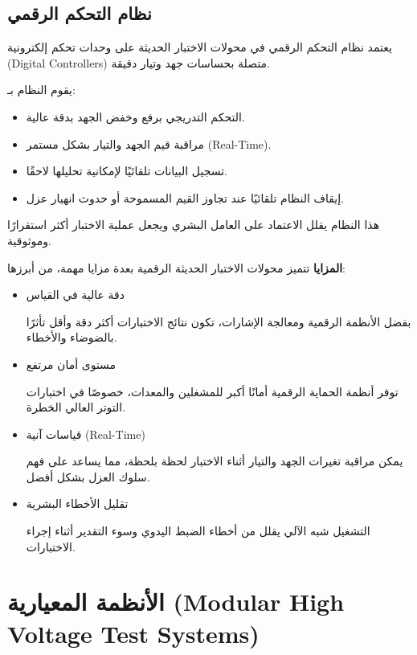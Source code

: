\documentclass[a4paper, 14pt]{extarticle} %
\newcommand{\en}{\textenglish}
\begin{document}
      \subsection{نظام التحكم الرقمي}
        يعتمد نظام التحكم الرقمي في محولات الاختبار الحديثة على وحدات تحكم إلكترونية\\
        \en{(Digital Controllers)}
        متصلة بحساسات جهد وتيار دقيقة.

        يقوم النظام بـ:
          \begin{itemize}
            \item 
            التحكم التدريجي برفع وخفض الجهد بدقة عالية.
            \item 
            مراقبة قيم الجهد والتيار بشكل مستمر \en{(Real-Time)}.
            \item 
            تسجيل البيانات تلقائيًا لإمكانية تحليلها لاحقًا.
            \item 
            إيقاف النظام تلقائيًا عند تجاوز القيم المسموحة أو حدوث انهيار عزل.
          \end{itemize}
        هذا النظام يقلل الاعتماد على العامل البشري ويجعل عملية الاختبار أكثر استقرارًا وموثوقية.

        \textbf{المزايا}
        تتميز محولات الاختبار الحديثة الرقمية بعدة مزايا مهمة، من أبرزها:
        \begin{itemize}
          \item 
          دقة عالية في القياس

          بفضل الأنظمة الرقمية ومعالجة الإشارات، تكون نتائج الاختبارات أكثر دقة وأقل تأثرًا بالضوضاء والأخطاء.
          \item 
          مستوى أمان مرتفع

          توفر أنظمة الحماية الرقمية أمانًا أكبر للمشغلين والمعدات، خصوصًا في اختبارات التوتر العالي الخطرة.
          \item 
          قياسات آنية \en{(Real-Time)}

          يمكن مراقبة تغيرات الجهد والتيار أثناء الاختبار لحظة بلحظة، مما يساعد على فهم سلوك العزل بشكل أفضل.
          \item 
          تقليل الأخطاء البشرية

          التشغيل شبه الآلي يقلل من أخطاء الضبط اليدوي وسوء التقدير أثناء إجراء الاختبارات.
        \end{itemize}
    \section{الأنظمة المعيارية \en{(Modular High Voltage Test Systems)}}
\end{document}
